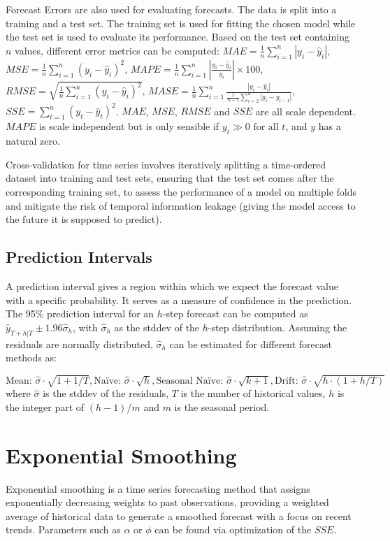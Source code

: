 Forecast Errors are also used for evaluating forecasts. The data is split into a training and a test set.
The training set is used for fitting the chosen model while the test set is used to evaluate its performance.
Based on the test set containing $ n $ values, different error metrics can be computed:
$ MAE = \frac{1}{n} \sum_{i=1}^{n} |y_i - \hat{y}_i| $,
$ MSE = \frac{1}{n} \sum_{i=1}^{n} (y_i - \hat{y}_i)^2 $,
$ MAPE = \frac{1}{n} \sum_{i=1}^{n} \left| \frac{y_i - \hat{y}_i}{y_i} \right| \times 100 $,
$ RMSE = \sqrt{\frac{1}{n} \sum_{i=1}^{n} (y_i - \hat{y}_i)^2} $,
$ MASE = \frac{1}{n} \sum_{i=1}^{n} \frac{|y_i - \hat{y}_i|}{\frac{1}{n-1} \sum_{i=2}^{n} |y_i - y_{i-1}|} $,
$ SSE = \sum_{t=1}^{n} (y_t - \hat{y}_t)^2 $.
$ MAE $, $ MSE $, $ RMSE $ and $ SSE $ are all scale dependent.
$ MAPE $ is scale independent but is only sensible if $ y_t \gg 0 \text{ for all } t $, and $ y $ has a natural zero.

Cross-validation for time series involves iteratively splitting a time-ordered dataset into training and test sets,
ensuring that the test set comes after the corresponding training set,
to assess the performance of a model on multiple folds and mitigate the risk of temporal information leakage
(giving the model access to the future it is supposed to predict).

\subsection{Prediction Intervals}
A prediction interval gives a region within which we expect the forecast value with a specific probability.
It serves as a measure of confidence in the prediction. The 95\% prediction interval for an $ h $-step forecast can be computed
as $ \hat{y}_{T+h|T} \pm 1.96 \hat{\sigma}_h $, with $ \hat{\sigma}_h $ as the stddev of the $ h $-step distribution.
Assuming the residuals are normally distributed, $ \hat{\sigma}_h $ can be estimated for different forecast methods as:

$ \text{Mean: } \hat{\sigma} \cdot \sqrt{1+1/T}, \text{Naïve: } \hat{\sigma} \cdot \sqrt{h},
\text{Seasonal Naïve: } \hat{\sigma} \cdot \sqrt{k+1}, \text{Drift: } \hat{\sigma} \cdot \sqrt{h \cdot (1+h/T)} $
where $ \hat{\sigma} $ is the stddev of the residuals, $ T $ is the number of historical values, $ h $ is the integer part of $ (h-1)/m $ and $ m $ is the seasonal period.

\section{Exponential Smoothing}
Exponential smoothing is a time series forecasting method that assigns exponentially decreasing weights to past observations,
providing a weighted average of historical data to generate a smoothed forecast with a focus on recent trends.
Parameters such as $ \alpha $ or $ \phi $ can be found via optimization of the $ SSE $.

